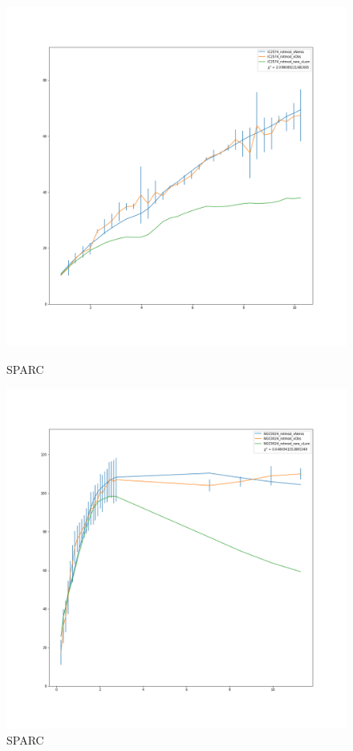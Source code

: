 \documentclass[reprint,%
 amsmath,amssymb,
 aps,
]{revtex4-1}
\begin{document}
 
\begin{figure} 
\centering
\begin{minipage}{0.5\textwidth}
  \includegraphics[width=.8\linewidth]{figures/IC2574_rotmod_XueSofue.png}
\caption{ SPARC\cite{2016Lelli}}
\label{fig:2574}
\end{minipage}
\begin{minipage}{0.5\textwidth}
  \includegraphics[width=.8\linewidth]{figures/NGC0024_rotmod_XueSofue.png}
\caption{ SPARC\cite{2016Lelli}}
\label{fig:2915}
\end{minipage}
\end{figure}
\end{document}
